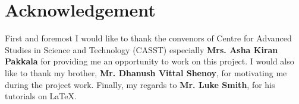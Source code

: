 \vfill
\vspace*{1cm}

\drawBorder

\center
\section{Acknowledgement}

\begin{spacing}{2}
First and foremost I would like to thank the convenors of Centre for Advanced Studies in Science and Technology (CASST) especially \textbf{Mrs. Asha Kiran Pakkala} for providing me an opportunity to work on this project. I would also like to thank my brother, \textbf{Mr. Dhanush Vittal Shenoy}, for motivating me during the project work. Finally, my regards to \textbf{Mr. Luke Smith}, for his tutorials on \LaTeX.
\end{spacing}
